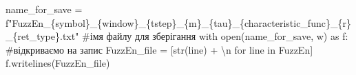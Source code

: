 \documentclass[
  letterpaper,
]{report}
\newenvironment{Shaded}{\begin{snugshade}}{\end{snugshade}}
\newcommand{\BuiltInTok}[1]{\textcolor[rgb]{0.00,0.23,0.31}{#1}}
\newcommand{\CharTok}[1]{\textcolor[rgb]{0.13,0.47,0.30}{#1}}
\newcommand{\CommentTok}[1]{\textcolor[rgb]{0.37,0.37,0.37}{#1}}
\newcommand{\ControlFlowTok}[1]{\textcolor[rgb]{0.00,0.23,0.31}{#1}}
\newcommand{\ImportTok}[1]{\textcolor[rgb]{0.00,0.46,0.62}{#1}}
\newcommand{\KeywordTok}[1]{\textcolor[rgb]{0.00,0.23,0.31}{#1}}
\newcommand{\NormalTok}[1]{\textcolor[rgb]{0.00,0.23,0.31}{#1}}
\newcommand{\OperatorTok}[1]{\textcolor[rgb]{0.37,0.37,0.37}{#1}}
\newcommand{\SpecialCharTok}[1]{\textcolor[rgb]{0.37,0.37,0.37}{#1}}
\newcommand{\SpecialStringTok}[1]{\textcolor[rgb]{0.13,0.47,0.30}{#1}}
\newcommand{\StringTok}[1]{\textcolor[rgb]{0.13,0.47,0.30}{#1}}
\begin{document}
\begin{Shaded}
\begin{Highlighting}[]
\NormalTok{name\_for\_save }\OperatorTok{=} \SpecialStringTok{f"FuzzEn\_}\SpecialCharTok{\{}\NormalTok{symbol}\SpecialCharTok{\}}\SpecialStringTok{\_}\SpecialCharTok{\{}\NormalTok{window}\SpecialCharTok{\}}\SpecialStringTok{\_}\SpecialCharTok{\{}\NormalTok{tstep}\SpecialCharTok{\}}\SpecialStringTok{\_}\SpecialCharTok{\{}\NormalTok{m}\SpecialCharTok{\}}\SpecialStringTok{\_}\SpecialCharTok{\{}\NormalTok{tau}\SpecialCharTok{\}}\SpecialStringTok{\_}\SpecialCharTok{\{}\NormalTok{characteristic\_func}\SpecialCharTok{\}}\SpecialStringTok{\_}\SpecialCharTok{\{}\NormalTok{r}\SpecialCharTok{\}}\SpecialStringTok{\_}\SpecialCharTok{\{}\NormalTok{ret\_type}\SpecialCharTok{\}}\SpecialStringTok{.txt"} \CommentTok{\#ім\textquotesingle{}я файлу для зберігання}
\ControlFlowTok{with} \BuiltInTok{open}\NormalTok{(name\_for\_save, }\StringTok{\textquotesingle{}w\textquotesingle{}}\NormalTok{) }\ImportTok{as}\NormalTok{ f: }\CommentTok{\#відкриваємо на запис }
\NormalTok{    FuzzEn\_file }\OperatorTok{=}\NormalTok{ [}\BuiltInTok{str}\NormalTok{(line) }\OperatorTok{+} \StringTok{\textquotesingle{}}\CharTok{\textbackslash{}n}\StringTok{\textquotesingle{}} \ControlFlowTok{for}\NormalTok{ line }\KeywordTok{in}\NormalTok{ FuzzEn]}
\NormalTok{    f.writelines(FuzzEn\_file)}
\end{Highlighting}
\end{Shaded}
\end{document}
